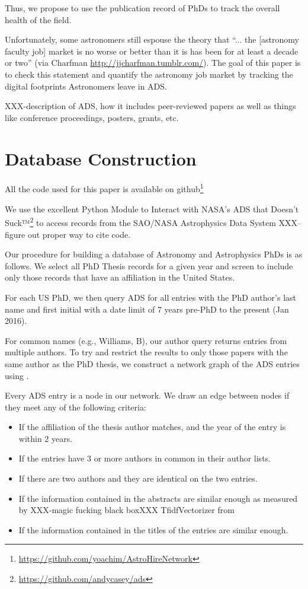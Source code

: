 \documentclass{emulateapj}
\begin{document}
Thus, we propose to use the publication record of PhDs to track the overall health of the field.  

Unfortunately, some astronomers still espouse the theory that ``... the [astronomy faculty job] market is no worse or better than it is has been for at least a decade or two'' (via Charfman \url{http://jjcharfman.tumblr.com/}).  The goal of this paper is to check this statement and quantify the astronomy job market by tracking the digital footprints Astronomers leave in ADS. 

XXX-description of ADS, how it includes peer-reviewed papers as well as things like conference proceedings, posters, grants, etc.

\section{Database Construction}

All the code used for this paper is available on github\footnote{\url{https://github.com/yoachim/AstroHireNetwork}}

We use the excellent Python Module to Interact with NASA's ADS that Doesn't Suck™\footnote{\url{https://github.com/andycasey/ads}} to access records from the SAO/NASA Astrophysics Data System XXX--figure out proper way to cite code. 

Our procedure for building a database of Astronomy and Astrophysics PhDs is as follows.  We select all PhD Thesis records for a given year and screen to include only those records that have an affiliation in the United States.

For each US PhD, we then query ADS for all entries with the PhD author's last name and first initial with a date limit of 7 years pre-PhD to the present (Jan 2016).

For common names (e.g.,  Williams, B), our author query returns entries from multiple authors.  To try and restrict the results to only those papers with the same author as the PhD thesis, we construct a network graph of the ADS entries using \citet{networkx}.

Every ADS entry is a node in our network. We draw an edge between nodes if they meet any of the following criteria:
\begin{itemize}
\item{If the affiliation of the thesis author matches, and the year of the entry is within 2 years.}
\item{If the entries have 3 or more authors in common in their author lists.}
\item{If there are two authors and they are identical on the two entries.}
\item{If the information contained in the abstracts are similar enough as measured by XXX-magic fucking black boxXXX TfidfVectorizer from \citet{scikit-learn}}
  \item{If the information contained in the titles of the entries are similar enough.}
\end{itemize}
\end{document}
